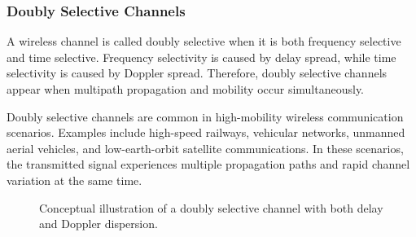 \subsubsection{Doubly Selective Channels}

A wireless channel is called doubly selective when it is both frequency selective and time selective. Frequency selectivity is caused by delay spread, while time selectivity is caused by Doppler spread. Therefore, doubly selective channels appear when multipath propagation and mobility occur simultaneously.

Doubly selective channels are common in high-mobility wireless communication scenarios. Examples include high-speed railways, vehicular networks, unmanned aerial vehicles, and low-earth-orbit satellite communications. In these scenarios, the transmitted signal experiences multiple propagation paths and rapid channel variation at the same time.

\begin{figure}[H]
    \centering


    \caption{Conceptual illustration of a doubly selective channel with both delay and Doppler dispersion.}
    \label{fig:doubly_selective_channel}
\end{figure}

